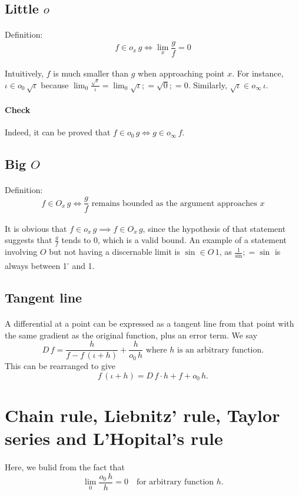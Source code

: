 \documentclass[11pt]{article}
\newcommand*\id{\iota}
\newcommand*\cd{\cdot}
\newcommand*\prg{\paragraph}
\begin{document}
\subsection{Little $o$}
\prg{}Definition:
\[
f\in o_x\,g\iff\lim_x\frac g f=0
\]
\prg{}Intuitively, $f$ is much smaller than $g$ when approaching point $x$. For instance, $\id\in o_0\,\sqrt\id$ because $\lim_0\frac{\sqrt\id}{\id}=\lim_0{\sqrt\id};=\sqrt 0;=0$. Similarly, $\sqrt\id\in o_\infty\,\id$.

\prg{Check}Indeed, it can be proved that $f\in o_0\,g\iff g\in o_\infty\,f$.

\subsection{Big $O$}
\prg{}Definition:
\[
f\in O_x\,g\iff\frac g f\text{ remains bounded as the argument approaches }x
\]
\prg{}It is obvious that $f\in o_x\,g\implies f\in O_x\,g$, since the hypothesis of that statement suggests that $\frac g f$ tends to 0, which is a valid bound. An example of a statement involving $O$ but not having a discernable limit is $\sin\in O\,1$, as $\frac 1\sin;=\sin$ is always between 1\textsuperscript- and 1.

\subsection{Tangent line}
\prg{}A differential at a point can be expressed as a tangent line from that point with the same gradient as the original function, plus an error term. We say
\[
D\,f=\frac{h}{f-f\,(\id+h)}+\frac{h}{o_0\,h}\text{ where $h$ is an arbitrary function.}
\]
This can be rearranged to give
\[
f\,(\id+h)=D\,f\cd h+f+o_0\,h\textrm{.}
\]

\section{Chain rule, Liebnitz' rule, Taylor series and L'Hopital's rule}
\prg{}Here, we bulid from the fact that
\[
\lim_0\frac{o_0\,h}{h}=0 \quad\textrm{for arbitrary function }h\textrm{.}
\]
\end{document}

